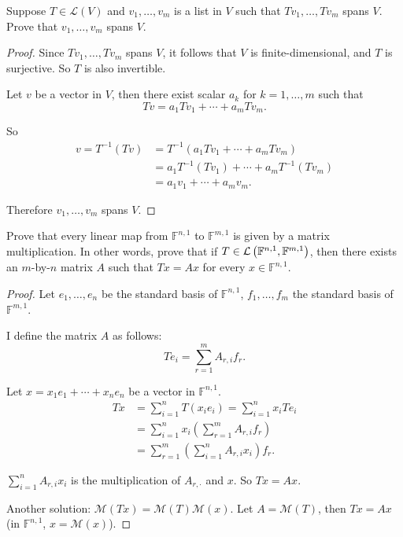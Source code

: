 \begin{exercise}
    Suppose $T \in \mathcal{L}(V)$ and $v_{1} , \ldots, v_{m}$ is a list in $V$ such that $Tv_{1}, \ldots, Tv_{m}$ spans $V$. Prove that $v_{1}, \ldots, v_{m}$ spans $V$.
\end{exercise}

\begin{proof}
    Since $Tv_{1}, \ldots, Tv_{m}$ spans $V$, it follows that $V$ is finite-dimensional, and $T$ is surjective. So $T$ is also invertible.

    Let $v$ be a vector in $V$, then there exist scalar $a_{k}$ for $k = 1, \ldots, m$ such that
    \[
        Tv = a_{1}Tv_{1} + \cdots + a_{m}Tv_{m}.
    \]

    So
    \begin{align*}
        v = T^{-1}(Tv) & = T^{-1}(a_{1}Tv_{1} + \cdots + a_{m}Tv_{m})         \\
                       & = a_{1}T^{-1}(Tv_{1}) + \cdots + a_{m}T^{-1}(Tv_{m}) \\
                       & = a_{1}v_{1} + \cdots + a_{m}v_{m}.
    \end{align*}

    Therefore $v_{1}, \ldots, v_{m}$ spans $V$.
\end{proof}
\newpage

\begin{exercise}
    Prove that every linear map from $\mathbb{F}^{n, 1}$ to $\mathbb{F}^{m, 1}$ is given by a matrix multiplication. In other words, prove that if $T \in \mathcal{L}\left({\mathbb{F}^{n, 1}, \mathbb{F}^{m, 1}}\right)$, then there exists an $m$-by-$n$ matrix $A$ such that $Tx = Ax$ for every $x \in \mathbb{F}^{n, 1}$.
\end{exercise}

\begin{proof}
    Let $e_{1}, \ldots, e_{n}$ be the standard basis of $\mathbb{F}^{n,1}$, $f_{1}, \ldots, f_{m}$ the standard basis of $\mathbb{F}^{m,1}$.

    I define the matrix $A$ as follows:
    \[
        Te_{i} = \sum^{m}_{r=1}A_{r,i}f_{r}.
    \]

    Let $x = x_{1}e_{1} + \cdots + x_{n}e_{n}$ be a vector in $\mathbb{F}^{n,1}$.
    \begin{align*}
        Tx & = \sum^{n}_{i=1}T(x_{i}e_{i}) = \sum^{n}_{i=1}x_{i}Te_{i}     \\
           & = \sum^{n}_{i=1}x_{i}\left(\sum^{m}_{r=1}A_{r,i}f_{r}\right)  \\
           & = \sum^{m}_{r=1}\left(\sum^{n}_{i=1}A_{r,i}x_{i}\right)f_{r}.
    \end{align*}

    $\sum^{n}_{i=1}A_{r,i}x_{i}$ is the multiplication of $A_{r,\cdot}$ and $x$. So $Tx = Ax$.

    \bigskip

    Another solution: $\mathcal{M}(Tx) = \mathcal{M}(T)\mathcal{M}(x)$. Let $A = \mathcal{M}(T)$, then $Tx = Ax$ (in $\mathbb{F}^{n,1}$, $x = \mathcal{M}(x)$).
\end{proof}
\newpage

